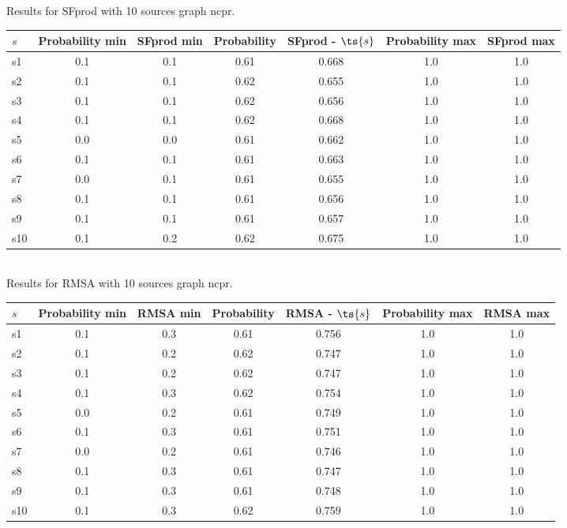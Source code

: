 \documentclass{article}
\begin{document}
\noindent Results for SFprod with 10 sources graph ncpr.

\noindent\begin{tabular}{|l|c|c|c|c|c|c|}
\hline
$s$& Probability min & SFprod min & Probability & SFprod - $\ts{s}$ & Probability max & SFprod max\\
\hline
s1 &0.1 & 0.1 & 0.61 & 0.668 & 1.0 & 1.0\\
\hline
s2 &0.1 & 0.1 & 0.62 & 0.655 & 1.0 & 1.0\\
\hline
s3 &0.1 & 0.1 & 0.62 & 0.656 & 1.0 & 1.0\\
\hline
s4 &0.1 & 0.1 & 0.62 & 0.668 & 1.0 & 1.0\\
\hline
s5 &0.0 & 0.0 & 0.61 & 0.662 & 1.0 & 1.0\\
\hline
s6 &0.1 & 0.1 & 0.61 & 0.663 & 1.0 & 1.0\\
\hline
s7 &0.0 & 0.1 & 0.61 & 0.655 & 1.0 & 1.0\\
\hline
s8 &0.1 & 0.1 & 0.61 & 0.656 & 1.0 & 1.0\\
\hline
s9 &0.1 & 0.1 & 0.61 & 0.657 & 1.0 & 1.0\\
\hline
s10 &0.1 & 0.2 & 0.62 & 0.675 & 1.0 & 1.0\\
\hline
\end{tabular}\\

\noindent Results for RMSA with 10 sources graph ncpr.

\noindent\begin{tabular}{|l|c|c|c|c|c|c|}
\hline
$s$& Probability min & RMSA min & Probability & RMSA - $\ts{s}$ & Probability max & RMSA max\\
\hline
s1 &0.1 & 0.3 & 0.61 & 0.756 & 1.0 & 1.0\\
\hline
s2 &0.1 & 0.2 & 0.62 & 0.747 & 1.0 & 1.0\\
\hline
s3 &0.1 & 0.2 & 0.62 & 0.747 & 1.0 & 1.0\\
\hline
s4 &0.1 & 0.3 & 0.62 & 0.754 & 1.0 & 1.0\\
\hline
s5 &0.0 & 0.2 & 0.61 & 0.749 & 1.0 & 1.0\\
\hline
s6 &0.1 & 0.3 & 0.61 & 0.751 & 1.0 & 1.0\\
\hline
s7 &0.0 & 0.2 & 0.61 & 0.746 & 1.0 & 1.0\\
\hline
s8 &0.1 & 0.3 & 0.61 & 0.747 & 1.0 & 1.0\\
\hline
s9 &0.1 & 0.3 & 0.61 & 0.748 & 1.0 & 1.0\\
\hline
s10 &0.1 & 0.3 & 0.62 & 0.759 & 1.0 & 1.0\\
\hline
\end{tabular}\\
\end{document}

